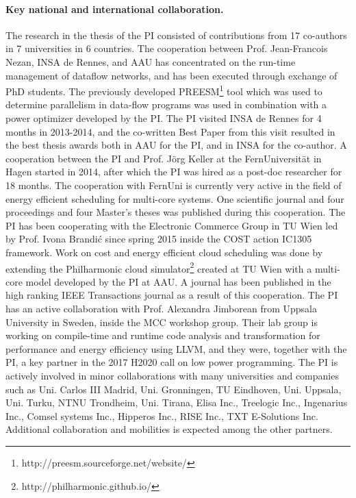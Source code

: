 \documentclass{article}
\begin{document}
\paragraph{Key national and international collaboration.}
The research in the thesis of the PI consisted of contributions from 17 co-authors in 7 universities in 6 countries.
The cooperation between Prof. Jean-Francois Nezan, INSA de Rennes, and AAU has concentrated on the run-time management of dataflow networks, 
and has been executed through exchange of PhD students.
The previously developed PREESM\footnote{http://preesm.sourceforge.net/website/} tool which was used to determine parallelism in data-flow programs was used in combination with a power optimizer developed by the PI. 
The PI visited INSA de Rennes for 4 months in 2013-2014, and the co-written Best Paper from this visit resulted in the best thesis awards both in AAU for the PI, and in INSA for the co-author.
A cooperation between the PI and Prof. J\"{o}rg Keller at the FernUniversit\"{a}t in Hagen started in 2014, after which the PI was hired as a post-doc researcher for 18 months.
The cooperation with FernUni is currently very active in the field of energy efficient scheduling for multi-core systems. 
One scientific journal and four proceedings and four Master's theses was published during this cooperation.
The PI has been cooperating with the Electronic Commerce Group in TU Wien led by Prof. Ivona Brandi\'{c} since spring 2015 inside the COST action IC1305 framework. 
Work on cost and energy efficient cloud scheduling was done by extending the Philharmonic cloud simulator\footnote{http://philharmonic.github.io/} created at TU Wien with a multi-core model developed by the PI at AAU. 
A journal has been published in the high ranking IEEE Transactions journal as a result of this cooperation.
The PI has an active collaboration with Prof. Alexandra Jimborean from Uppsala University in Sweden, inside the MCC workshop group.
Their lab group is working on compile-time and runtime code analysis and transformation for performance and energy efficiency using LLVM, and they were, together with the PI, a key partner in the 2017 H2020 call on low power programming.
The PI is actively involved in minor collaborations with many universities and companies such as Uni. Carlos III Madrid, Uni. Gronningen, TU Eindhoven, Uni. Uppsala, Uni. Turku, NTNU Trondheim, Uni. Tirana, Elisa Inc., Treelogic Inc., Ingenarius Inc., Comsel systems Inc., Hipperos Inc., RISE Inc., TXT E-Solutions Inc.
Additional collaboration and mobilities is expected among the other partners.
\end{document}
